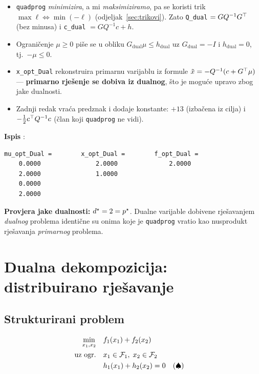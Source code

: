 \begin{itemize}
  \item \texttt{quadprog} \emph{minimizira}, a mi \emph{maksimiziramo}, pa se
        koristi trik $\max \ell \Leftrightarrow \min(-\ell)$
        (odjeljak~\ref{sec:trikovi}). Zato \texttt{Q\_dual} $= GQ^{-1}G^{\top}$ (bez
        minusa) i \texttt{c\_dual} $= GQ^{-1}c + h$.
  \item Ograničenje $\mu \ge 0$ piše se u obliku $G_{\text{dual}}\mu \le
        h_{\text{dual}}$ uz $G_{\text{dual}} = -I$ i $h_{\text{dual}} = 0$, tj.\
        $-\mu \le 0$.
  \item \texttt{x\_opt\_Dual} rekonstruira primarnu varijablu iz formule
        $\tilde x = -Q^{-1}(c + G^{\top}\mu)$ --- \textbf{primarno rješenje se dobiva
        iz dualnog}, što je moguće upravo zbog jake dualnosti.
  \item Zadnji redak vraća predznak i dodaje konstante: $+13$ (izbačena iz
        cilja) i $-\tfrac12 c^{\top} Q^{-1}c$ (član koji \texttt{quadprog} ne vidi).
\end{itemize}

\textbf{Ispis} :

\begin{verbatim}
mu_opt_Dual =        x_opt_Dual =        f_opt_Dual =
    0.0000               2.0000              2.0000
    2.0000               1.0000
    0.0000
    2.0000
\end{verbatim}

\textbf{Provjera jake dualnosti:} $d^{\star} = 2 = p^{\star}$. \checkmark Dualne
varijable dobivene rješavanjem \emph{dualnog} problema identične su onima koje
je \texttt{quadprog} vratio kao nusprodukt rješavanja \emph{primarnog} problema.

\section{Dualna dekompozicija: distribuirano rješavanje}
\label{sec:dekompozicija}

\subsection{Strukturirani problem}

\begin{equation}
\label{eq:strukturiran}
\begin{aligned}
\min_{x_1,x_2} \quad & f_1(x_1) + f_2(x_2) \\
\text{uz ogr.} \quad & x_1 \in \mathcal{F}_1, \; x_2 \in \mathcal{F}_2 \\
& h_1(x_1) + h_2(x_2) = 0 && (\spadesuit)
\end{aligned}
\end{equation}

